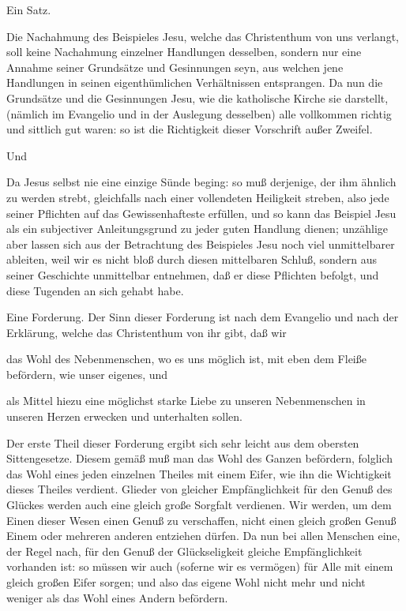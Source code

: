 \begin{aufza}
\begin{aufzb}
\end{aufzb}
\item {}\par
\begin{aufzb}
\item Ein  Satz.\par
Die Nachahmung des Beispieles Jesu, welche das Christenthum von uns verlangt, soll keine Nachahmung einzelner Handlungen desselben, sondern nur eine Annahme seiner Grundsätze und Gesinnungen seyn, aus welchen jene Handlungen in seinen eigenthümlichen Verhältnissen entsprangen. Da nun die Grundsätze und die Gesinnungen Jesu, wie die katholische Kirche sie darstellt, (nämlich im Evangelio und in der Auslegung desselben) alle vollkommen richtig und sittlich gut waren: so ist die Richtigkeit dieser Vorschrift außer Zweifel.
\item Und \par
Da Jesus selbst nie eine einzige Sünde beging: so muß derjenige, der ihm ähnlich zu werden strebt, gleichfalls nach einer vollendeten Heiligkeit streben, also jede seiner Pflichten auf das Gewissenhafteste erfüllen, und so kann das Beispiel Jesu als ein subjectiver Anleitungsgrund zu jeder guten Handlung dienen; unzählige aber lassen sich aus der Betrachtung des Beispieles Jesu noch viel unmittelbarer ableiten, weil wir es nicht bloß durch diesen mittelbaren Schluß, sondern aus seiner Geschichte unmittelbar entnehmen, daß er diese Pflichten befolgt, und diese Tugenden an sich gehabt habe.
\end{aufzb}
\item {}\par
\begin{aufzb}
\item Eine  Forderung.
Der Sinn dieser Forderung ist nach dem Evangelio und nach der Erklärung, welche das Christenthum von ihr gibt, daß wir~
\begin{aufzc}
\item das Wohl des Nebenmenschen, wo es uns möglich ist, mit eben dem Fleiße befördern, wie unser eigenes, und
\item als Mittel hiezu eine möglichst starke Liebe zu unseren Nebenmenschen in unseren Herzen erwecken und unterhalten sollen.
\end{aufzc}
Der erste Theil dieser Forderung ergibt sich sehr leicht aus dem obersten Sittengesetze. Diesem gemäß muß man das Wohl des Ganzen befördern, folglich das Wohl eines jeden einzelnen Theiles mit einem Eifer, wie ihn die Wichtigkeit dieses Theiles verdient. Glieder von gleicher Empfänglichkeit für den Genuß des Glückes werden auch eine gleich große Sorgfalt verdienen. Wir werden, um dem Einen dieser Wesen einen Genuß zu verschaffen, nicht einen gleich großen Genuß Einem oder mehreren anderen entziehen dürfen. Da nun bei allen Menschen eine, der Regel nach, für den Genuß der Glückseligkeit gleiche Empfänglichkeit vorhanden ist: so müssen wir auch (soferne wir es vermögen) für Alle mit einem gleich großen Eifer sorgen; und also das eigene Wohl nicht mehr und nicht weniger als das Wohl eines Andern befördern.\par

\end{aufzb}
\end{aufza}
